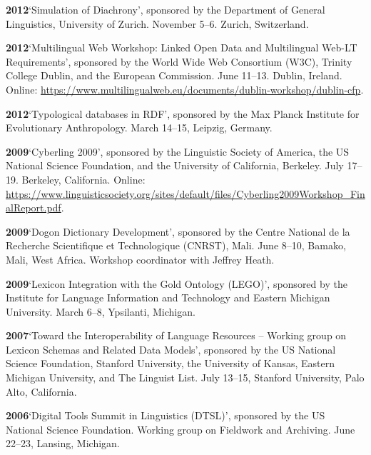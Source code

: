 \documentclass[11pt]{article}
\newcommand{\hangpara}{
 \setlength{\parindent}{0in} %
 \hangindent=0.42in %
}
\begin{document}
\vskip 6pt
\hangpara
{\bf 2012}\hspace{1ex}`Simulation of Diachrony', sponsored by the Department of General Linguistics, University of Zurich. November 5--6. Zurich, Switzerland.

\vskip 6pt
\hangpara
{\bf 2012}\hspace{1ex}`Multilingual Web Workshop: Linked Open Data and Multilingual Web-LT Requirements', sponsored by the World Wide Web Consortium (W3C), Trinity College Dublin, and the European Commission. June 11--13. Dublin, Ireland. Online: \url{https://www.multilingualweb.eu/documents/dublin-workshop/dublin-cfp}.

\vskip 6pt
\hangpara
{\bf 2012}\hspace{1ex}`Typological databases in RDF', sponsored by the Max Planck Institute for Evolutionary Anthropology. March 14--15, Leipzig, Germany. 

\vskip 6pt
\hangpara
{\bf 2009}\hspace{1ex}`Cyberling 2009', sponsored by the Linguistic Society of America, the US National Science Foundation, and the University of California, Berkeley. July 17--19. Berkeley, California. Online: \url{https://www.linguisticsociety.org/sites/default/files/Cyberling2009Workshop_FinalReport.pdf}.

\vskip 6pt
\hangpara
{\bf 2009}\hspace{1ex}`Dogon Dictionary Development', sponsored by the Centre National de la Recherche Scientifique et Technologique (CNRST), Mali. June 8--10, Bamako, Mali, West Africa. Workshop coordinator with Jeffrey Heath.

\vskip 6pt
\hangpara
{\bf 2009}\hspace{1ex}`Lexicon Integration with the Gold Ontology (LEGO)', sponsored by the Institute for Language Information and Technology and Eastern Michigan University. March 6--8, Ypsilanti, Michigan.

\vskip 6pt
\hangpara
{\bf 2007}\hspace{1ex}`Toward the Interoperability of Language Resources -- Working group on Lexicon Schemas and Related Data Models', sponsored by the US National Science Foundation, Stanford University, the University of Kansas, Eastern Michigan University, and The Linguist List. July 13--15, Stanford University, Palo Alto, California.

\vskip 6pt
\hangpara
{\bf 2006}\hspace{1ex}`Digital Tools Summit in Linguistics (DTSL)', sponsored by the US National Science Foundation. Working group on Fieldwork and Archiving. June 22--23, Lansing, Michigan.
\end{document}
